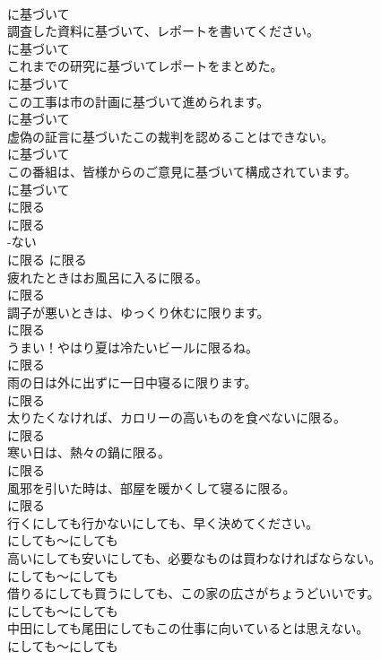 \documentclass[8pt]{extreport}
\begin{document}
\begin{CJK}{UTF8}{min}
\\	に基づいて
\\	調査した資料に基づいて、レポートを書いてください。	
\\	に基づいて
\\	これまでの研究に基づいてレポートをまとめた。	
\\	に基づいて
\\	この工事は市の計画に基づいて進められます。	
\\	に基づいて
\\	虚偽の証言に基づいたこの裁判を認めることはできない。	
\\	に基づいて
\\	この番組は、皆様からのご意見に基づいて構成されています。	
\\	に基づいて
\\	に限る	
\\	に限る	
\\	-ない
\\	に限る	に限る
\\	疲れたときはお風呂に入るに限る。	
\\	に限る
\\	調子が悪いときは、ゆっくり休むに限ります。	
\\	に限る
\\	うまい！やはり夏は冷たいビールに限るね。	
\\	に限る
\\	雨の日は外に出ずに一日中寝るに限ります。	
\\	に限る
\\	太りたくなければ、カロリーの高いものを食べないに限る。	
\\	に限る
\\	寒い日は、熱々の鍋に限る。	
\\	に限る
\\	風邪を引いた時は、部屋を暖かくして寝るに限る。	
\\	に限る
\\	行くにしても行かないにしても、早く決めてください。	
\\	にしても～にしても
\\	高いにしても安いにしても、必要なものは買わなければならない。	
\\	にしても～にしても
\\	借りるにしても買うにしても、この家の広さがちょうどいいです。	
\\	にしても～にしても
\\	中田にしても尾田にしてもこの仕事に向いているとは思えない。	
\\	にしても～にしても

\end{CJK}
\end{document}
